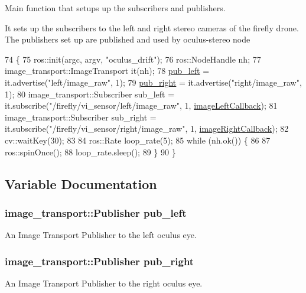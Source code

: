 Main function that setups up the subscribers and publishers. 

It sets up the subscribers to the left and right stereo camera\textquotesingle{}s of the firefly drone. The publishers set up are published and used by oculus-\/stereo node 
\begin{DoxyCode}
74 \{
75   ros::init(argc, argv, \textcolor{stringliteral}{"oculus\_drift"});
76   ros::NodeHandle nh;
77   image\_transport::ImageTransport it(nh);
78   \hyperlink{oculus-drift_8cpp_a1d96cf0c556aa6b5ba7b3b7ad43ca252}{pub\_left} = it.advertise(\textcolor{stringliteral}{"left/image\_raw"}, 1);
79   \hyperlink{oculus-drift_8cpp_a69feb6a1df472e1ccf35b35d4f63edd2}{pub\_right} = it.advertise(\textcolor{stringliteral}{"right/image\_raw"}, 1);
80   image\_transport::Subscriber sub\_left = it.subscribe(\textcolor{stringliteral}{"/firefly/vi\_sensor/left/image\_raw"}, 1, 
      \hyperlink{oculus-drift_8cpp_accfc2045f699b2d8782deca8e1d971cf}{imageLeftCallback});
81   image\_transport::Subscriber sub\_right = it.subscribe(\textcolor{stringliteral}{"/firefly/vi\_sensor/right/image\_raw"}, 1, 
      \hyperlink{oculus-drift_8cpp_a2bee7d800dfae62103d7aaa2e0961787}{imageRightCallback});
82   cv::waitKey(30);
83 
84   ros::Rate loop\_rate(5);
85   \textcolor{keywordflow}{while} (nh.ok()) \{
86 
87     ros::spinOnce();
88     loop\_rate.sleep();
89   \}
90 \}
\end{DoxyCode}


\subsection{Variable Documentation}
\subsubsection[{\texorpdfstring{pub\+\_\+left}{pub_left}}]{\setlength{\rightskip}{0pt plus 5cm}image\+\_\+transport\+::\+Publisher pub\+\_\+left}\hypertarget{oculus-drift_8cpp_a1d96cf0c556aa6b5ba7b3b7ad43ca252}{}\label{oculus-drift_8cpp_a1d96cf0c556aa6b5ba7b3b7ad43ca252}


An Image Transport Publisher to the left oculus eye. 

\subsubsection[{\texorpdfstring{pub\+\_\+right}{pub_right}}]{\setlength{\rightskip}{0pt plus 5cm}image\+\_\+transport\+::\+Publisher pub\+\_\+right}\hypertarget{oculus-drift_8cpp_a69feb6a1df472e1ccf35b35d4f63edd2}{}\label{oculus-drift_8cpp_a69feb6a1df472e1ccf35b35d4f63edd2}


An Image Transport Publisher to the right oculus eye. 

